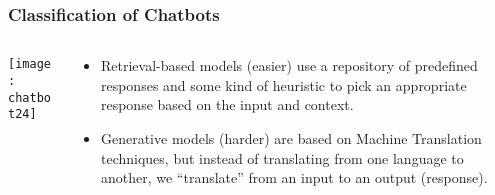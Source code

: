 \begin{frame}[fragile]\frametitle{Classification of Chatbots}
    \begin{columns}
    \begin{column}[t]{0.5\linewidth}
	
\begin{center}
\texttt{[image: chatbot24]}
\end{center}
    \end{column}
    \begin{column}[t]{0.5\linewidth}

\begin{itemize}
\item Retrieval-based models (easier) use a repository of predefined responses and some kind of heuristic to pick an appropriate response based on the input and context. 
\item Generative models (harder) are based on Machine Translation techniques, but instead of translating from one language to another, we “translate” from an input to an output (response).
\end{itemize}
    \end{column}
    \end{columns}

\end{frame}







